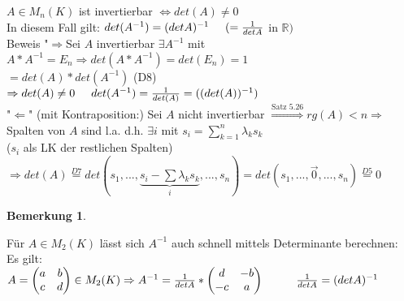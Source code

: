 \documentclass[a4paper,11pt]{article}
\newtheorem{bem}[definition]{Bemerkung}
\begin{document}
$A\in M_n(K)$ ist invertierbar $\Leftrightarrow det(A)\neq 0$ \\
In diesem Fall gilt: $det(A^{-1})=(detA)^{-1}\hspace{5mm}(=\frac{1}{detA}$ in $\mathbb{R})$ \\
Beweis "$\Rightarrow$\grqq Sei $A$ invertierbar $\exists A^{-1}$ mit $A*A^{-1}=E_n\Rightarrow det(A*A^{-1})=det(E_n)=1$ \\
$=det(A)*det(A^{-1})$ (D8) \\
$\Rightarrow det(A)\neq0 \hspace{5mm}det(A^{-1})=\frac{1}{det(A)}=((det(A))^{-1})$ \\
"$\Leftarrow$" (mit Kontraposition:) Sei $A$ nicht invertierbar $\overset{\text{Satz 5.26}}{\Rightarrow} rg(A)<n\Rightarrow$ Spalten von $A$ sind l.a. d.h. $\exists i$ mit $s_i=\sum^n_{k=1}\lambda_ks_k$ \\
($s_i$ als LK der restlichen Spalten) \\
$\Rightarrow det(A)\overset{D7}{=}det(s_1,...,\underbrace{s_i-\sum\lambda_ks_k}_{i},...,s_n)=det(s_1,...,\overset{\rightarrow}{0},...,s_n)\overset{D5}{=}0$
\begin{bem}
\end{bem}
Für $A\in M_2(K)$ lässt sich $A^{-1}$ auch schnell mittels Determinante berechnen: \\
Es gilt: $A=\begin{pmatrix}a&b\\c&d\end{pmatrix}\in M_2(K)\Rightarrow A^{-1}=\frac{1}{detA}*\begin{pmatrix}d&-b\\-c&a\end{pmatrix}\hspace{10mm}\frac{1}{detA}=(detA)^{-1}$
\newpage
\end{document}
